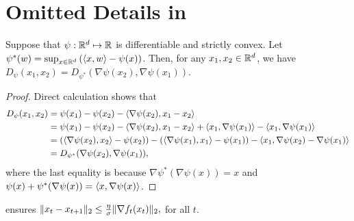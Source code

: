 \section{Omitted Details in }\label{app: alt-oco}

\begin{lemma}\label{lem:conj_dual}
    Suppose that $\psi:\mathbb{R}^d\mapsto\mathbb{R}$ is differentiable and strictly convex. Let $\psi^*(w)=\sup_{x\in\mathbb{R}^d}\left(\left\langle {x,w} \right\rangle-\psi(x)\right)$. Then, for any $x_1,x_2\in\mathbb{R}^d$, we have $D_{\psi}(x_1,x_2) = D_{\psi^*}(\nabla\psi(x_2),\nabla\psi(x_1))$.
\end{lemma}
\begin{proof}
    Direct calculation shows that
    \begin{align*}
        D_{\psi}(x_1,x_2) &= \psi(x_1) - \psi(x_2) - \left\langle {\nabla\psi(x_2),x_1-x_2} \right\rangle \\
        &= \psi(x_1) - \psi(x_2) - \left\langle {\nabla\psi(x_2),x_1-x_2} \right\rangle + \left\langle {x_1,\nabla\psi(x_1)} \right\rangle - \left\langle {x_1,\nabla\psi(x_1)} \right\rangle\\
        &=(\left\langle {\nabla\psi(x_2),x_2} \right\rangle-\psi(x_2)) - (\left\langle {\nabla\psi(x_1),x_1} \right\rangle-\psi(x_1)) - \left\langle {x_1,\nabla\psi(x_2) - \nabla\psi(x_1)} \right\rangle \\
        &=D_{\psi^*}(\nabla\psi(x_2),\nabla\psi(x_1)),
    \end{align*}
    where the last equality is because $\nabla\psi^*(\nabla\psi(x))=x$ and $\psi(x)+\psi^*(\nabla\psi(x))=\left\langle {x,\nabla\psi(x)} \right\rangle$.
\end{proof}

\begin{lemma}\label{lem:path_length}
     ensures
    $
        \lVert x_t-x_{t+1}\rVert_2 \le \frac{\eta}{\sigma}\lVert\nabla f_t(x_t)\rVert_2,
    $
    for all $t$.
\end{lemma}

